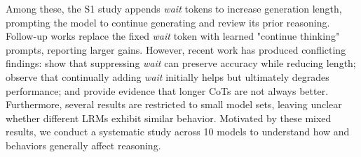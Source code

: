  Among these, the S1 study \citep{muennighoff2025s1} appends \textit{wait} tokens to increase generation length, prompting the model to continue generating and review its prior reasoning. Follow-up works \citep{ringel2025learning, jurayj2025your} replace the fixed \textit{wait} token with learned "continue thinking" prompts, reporting larger gains. However, recent work has produced conflicting findings: \citet{wang2025wait} show that suppressing \textit{wait} can preserve accuracy while reducing length; \citet{ghosal2025does, marjanovic2025deepseek, wu2025s} observe that continually adding \textit{wait} initially helps but ultimately degrades performance; and \citet{wu2025more} provide evidence that longer CoTs are not always better. Furthermore, several results are restricted to small model sets, leaving unclear whether different LRMs exhibit similar behavior. Motivated by these mixed results, we conduct a systematic study across 10 models to understand how \Length and \Review behaviors generally affect reasoning.


